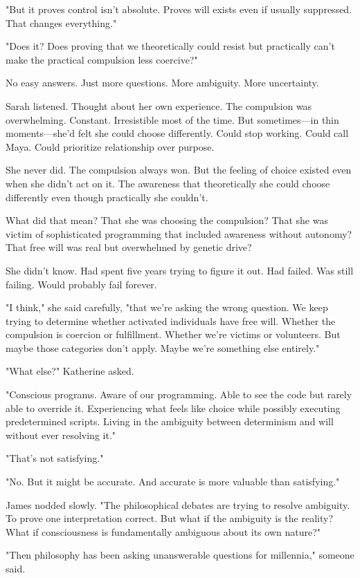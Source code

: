 "But it proves control isn't absolute. Proves will exists even if usually suppressed. That changes everything."

"Does it? Does proving that we theoretically could resist but practically can't make the practical compulsion less coercive?"

No easy answers. Just more questions. More ambiguity. More uncertainty.

Sarah listened. Thought about her own experience. The compulsion was overwhelming. Constant. Irresistible most of the time. But sometimes—in thin moments—she'd felt she could choose differently. Could stop working. Could call Maya. Could prioritize relationship over purpose.

She never did. The compulsion always won. But the feeling of choice existed even when she didn't act on it. The awareness that theoretically she could choose differently even though practically she couldn't.

What did that mean? That she was choosing the compulsion? That she was victim of sophisticated programming that included awareness without autonomy? That free will was real but overwhelmed by genetic drive?

She didn't know. Had spent five years trying to figure it out. Had failed. Was still failing. Would probably fail forever.

"I think," she said carefully, "that we're asking the wrong question. We keep trying to determine whether activated individuals have free will. Whether the compulsion is coercion or fulfillment. Whether we're victims or volunteers. But maybe those categories don't apply. Maybe we're something else entirely."

"What else?" Katherine asked.

"Conscious programs. Aware of our programming. Able to see the code but rarely able to override it. Experiencing what feels like choice while possibly executing predetermined scripts. Living in the ambiguity between determinism and will without ever resolving it."

"That's not satisfying."

"No. But it might be accurate. And accurate is more valuable than satisfying."

James nodded slowly. "The philosophical debates are trying to resolve ambiguity. To prove one interpretation correct. But what if the ambiguity is the reality? What if consciousness is fundamentally ambiguous about its own nature?"

"Then philosophy has been asking unanswerable questions for millennia," someone said.


